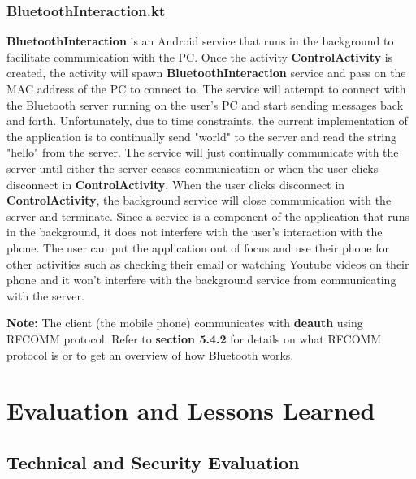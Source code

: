 \documentclass[letterpaper,twocolumn,10pt]{article}
\begin{document}
{{\subsubsection{BluetoothInteraction.kt}
\textbf{BluetoothInteraction} is an Android service that runs in the background to facilitate communication with the PC. Once the activity \textbf{ControlActivity} is created, the activity will spawn \textbf{BluetoothInteraction} service and pass on the MAC address of the PC to connect to. The service will attempt to connect with the Bluetooth server running on the user's PC and start sending messages back and forth. Unfortunately, due to time constraints, the current implementation of the application is to continually send "world" to the server and read the string "hello" from the server. The service will just continually communicate with the server until either the server ceases communication or when the user clicks disconnect in \textbf{ControlActivity}. When the user clicks disconnect in \textbf{ControlActivity}, the background service will close communication with the server and terminate. Since a service is a component of the application that runs in the background, it does not interfere with the user's interaction with the phone. The user can put the application out of focus and use their phone for other activities such as checking their email or watching Youtube videos on their phone and it won't interfere with the background service from communicating with the server.

\textbf{Note:} The client (the mobile phone) communicates with \textbf{deauth} using RFCOMM protocol. Refer to \textbf{section 5.4.2} for details on what RFCOMM protocol is or to get an overview of how Bluetooth works.

\section{Evaluation and Lessons Learned}
\subsection{Technical and Security Evaluation}

}}
\end{document}
